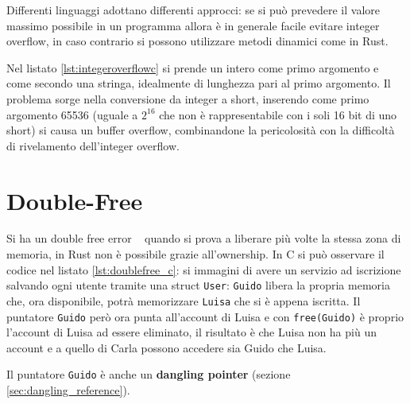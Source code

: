 \documentclass[Lau,binding=0.6cm]{sapthesis}
\newcommand{\textcode}[1]{\colorbox{backcolour}{\texttt{#1}}}
\begin{document}
Differenti linguaggi adottano differenti approcci: se si può prevedere il valore massimo possibile in un programma allora è in generale facile evitare integer overflow, in caso contrario si possono utilizzare metodi dinamici come in Rust. 




Nel listato \ref{lst:integeroverflowc} si prende un intero come primo argomento e come secondo una stringa, idealmente di lunghezza pari al primo argomento.
Il problema sorge nella conversione da integer a short, inserendo come primo argomento 65536 (uguale a $ 2^{16} $ che non è rappresentabile con i soli 16 bit di uno short) si causa un buffer overflow, combinandone la pericolosità con la difficoltà di rivelamento dell'integer overflow.




\section{Double-Free} \label{sec:double_free}
Si ha un double free error ~\cite[10.4.4]{gollmann:computersecurity} quando si prova a liberare più volte la stessa zona di memoria, in Rust non è possibile grazie all'ownership.
In C si può osservare il codice nel listato \ref{lst:doublefree_c}: si immagini di avere un servizio ad iscrizione salvando ogni utente tramite una struct \textcode{User}: \textcode{Guido} libera la propria memoria che, ora disponibile, potrà memorizzare \textcode{Luisa} che si è appena iscritta. 
Il puntatore \textcode{Guido} però ora punta all'account di Luisa e con \textcode{free(Guido)} è proprio l'account di Luisa ad essere eliminato, il risultato è che Luisa non ha più un account e a quello di Carla possono accedere sia Guido che Luisa.




Il puntatore \textcode{Guido} è anche un \textbf{dangling pointer} (sezione \ref{sec:dangling_reference}).
\end{document}
